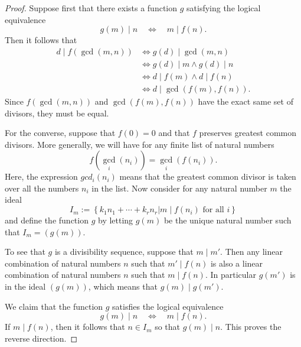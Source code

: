 \begin{proof}
  Suppose first that there exists a function $g$ satisfying the logical equivalence
  \begin{equation*}
    g(m)\mid n \quad\Leftrightarrow\quad m\mid f(n).
  \end{equation*}
  Then it follows that
  \begin{align*}
    d\mid f(\gcd(m,n)) & \Leftrightarrow g(d)\mid \gcd(m,n) \\
                       & \Leftrightarrow g(d)\mid m \land g(d)\mid n \\
                       & \Leftrightarrow d\mid f(m) \land d\mid f(n) \\
                       & \Leftrightarrow d\mid \gcd(f(m),f(n)).
  \end{align*}
  Since $f(\gcd(m,n))$ and $\gcd(f(m),f(n))$ have the exact same set of divisors, they must be equal.
  
  For the converse, suppose that $f(0)=0$ and that $f$ preserves greatest common divisors. More generally, we will have for any finite list of natural numbers
  \begin{equation*}
    f(\gcd_i(n_i))=\gcd_i(f(n_i)).
  \end{equation*}
  Here, the expression $gcd_i(n_i)$ means that the greatest common divisor is taken over all the numbers $n_i$ in the list. Now consider for any natural number $m$ the ideal
  \begin{equation*}
    I_m := \left\{ k_1n_1+\cdots+ k_rn_r \mathbin{\big|} m\mid f(n_i) \text{ for all } i \right\}
  \end{equation*}
  and define the function $g$ by letting $g(m)$ be the unique natural number such that $I_m=(g(m))$.

  To see that $g$ is a divisibility sequence, suppose that $m\mid m'$. Then any linear combination of natural numbers $n$ such that $m'\mid f(n)$ is also a linear combination of natural numbers $n$ such that $m\mid f(n)$. In particular $g(m')$ is in the ideal $(g(m))$, which means that $g(m)\mid g(m')$.

  We claim that the function $g$ satisfies the logical equivalence
  \begin{equation*}
    g(m)\mid n \quad\Leftrightarrow\quad m\mid f(n).
  \end{equation*}
  If $m\mid f(n)$, then it follows that $n\in I_m$ so that $g(m)\mid n$. This proves the reverse direction.


\end{proof}
